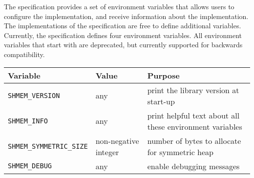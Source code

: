 The \openshmem specification provides a set of environment variables that allows
users to configure the \openshmem implementation, and receive information about
the implementation. The implementations of the specification are free to define
additional variables. Currently, the specification defines four environment
variables. All environment variables that start with  are
deprecated, but currently supported for backwards compatibility.

\medskip{}

\begin{tabular}{|l|l|l|}
\hline 
Variable & Value & Purpose\tabularnewline
\hline 
\hline 
\texttt{SHMEM\_VERSION} & any & print the library version at
start-up\tabularnewline
\hline 
\texttt{SHMEM\_INFO} & any & print helpful text about all these environment
variables\tabularnewline
\hline 
\texttt{SHMEM\_SYMMETRIC\_SIZE} & non-negative integer & number of bytes to
allocate for symmetric heap\tabularnewline
\hline 
\texttt{SHMEM\_DEBUG} & any & enable debugging messages\tabularnewline
\hline 
\end{tabular}

\medskip{}
